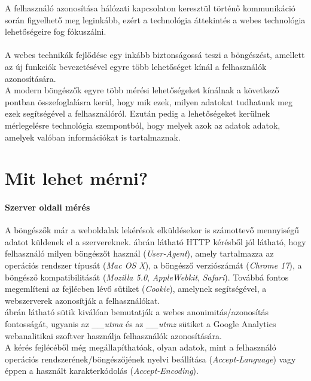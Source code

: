
A felhasználó azonosítása hálózati kapcsolaton keresztül történő kommunikáció során figyelhető meg leginkább, ezért a technológia áttekintés a webes technológia lehetőségeire fog fókuszálni.\\
\\
A webes technikák fejlődése egy inkább biztonságossá teszi a böngészést, amellett az új funkciók bevezetésével egyre több lehetőséget kínál a felhasználók azonosítására.\\
A modern böngészők egyre több mérési lehetőségeket kínálnak a következő pontban összefoglalásra kerül, hogy mik ezek, milyen adatokat tudhatunk meg ezek segítségével a felhasználóról. Ezután pedig a lehetőségeket kerülnek mérlegelésre technológia szempontból, hogy melyek azok az adatok adatok, amelyek valóban információkat is tartalmaznak.

\section{Mit lehet mérni?} %
\label{sec:miket_lehet_merni_}

\paragraph{Szerver oldali mérés} %
\label{par:szerver_oldali_meres}

A böngészők már a weboldalak lekérésok elküldésekor is számottevő mennyiségű adatot küldenek el a szervereknek.  ábrán látható HTTP kérésből jól látható, hogy felhasználó milyen böngészőt használ (\textit{User-Agent}), amely tartalmazza az operációs rendszer típusát (\textit{Mac OS X}), a böngésző verziószámát (\textit{Chrome 17}), a böngésző kompatibilitását (\textit{Mozilla 5.0}, \textit{AppleWebkit}, \textit{Safari}). Továbbá fontos megemlíteni az fejlécben lévő sütiket (\textit{Cookie}), amelynek segítségével, a webszerverek azonosítják a felhasználókat.\\
 ábrán látható sütik kiválóan bemutatják a webes anonimitás/azonosítás fontosságát, ugyanis az \textit{\_\_utma} és az \textit{\_\_utmz} sütiket a Google Analytics webanalitikai szoftver használja felhasználók azonosítására.\\
A kérés fejlécéből még megállapíthatóak, olyan adatok, mint a felhasználó operációs rendszerének/böngészőjének nyelvi beállítása (\textit{Accept-Language}) vagy éppen a használt karakterkódolás (\textit{Accept-Encoding}).\\
\clearpage

